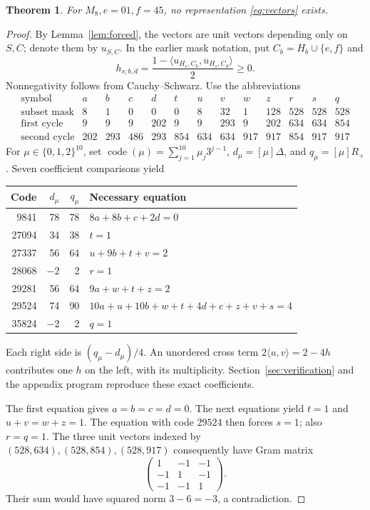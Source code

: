 \documentclass[11pt,a4paper]{article}
\newtheorem{theorem}{Theorem}
\begin{document}
\begin{theorem}\label{thm:vectors}
For $M_8,e=01,f=45$, no representation \eqref{eq:vectors} exists.
\end{theorem}
\begin{proof}
By Lemma~\ref{lem:forced}, the vectors are unit vectors depending
only on $S,C$; denote them by $u_{S,C}$. In the earlier mask notation,
put $C_b=H_b\cup\{e,f\}$ and
\[
 h_{s;b,d}=\frac{1-\langle u_{H_s,C_b},u_{H_s,C_d}\rangle}{2}\ge0.
\]
Nonnegativity follows from Cauchy--Schwarz. Use the abbreviations
\[
\begin{array}{c|rrrrrrrrrrrr}
\text{symbol}&a&b&c&d&t&u&v&w&z&r&s&q\\\hline
\text{subset mask}&8&1&0&0&0&8&32&1&128&528&528&528\\
\text{first cycle}&9&9&9&202&9&9&293&9&202&634&634&854\\
\text{second cycle}&202&293&486&293&854&634&634&917&917&854&917&917
\end{array}
\]
For $\mu\in\{0,1,2\}^{10}$, set
$\operatorname{code}(\mu)=\sum_{j=1}^{10}\mu_j3^{j-1}$,
$d_\mu=[\mu]\Delta$, and $q_\mu=[\mu]R_+$. Seven coefficient
comparisons yield
\begin{center}\small
\begin{tabular}{rrrl}
\toprule
Code & $d_\mu$ & $q_\mu$ & Necessary equation\\
\midrule
9841  & 78 & 78 & $8a+8b+c+2d=0$\\
27094 & 34 & 38 & $t=1$\\
27337 & 56 & 64 & $u+9b+t+v=2$\\
28068 & $-2$ & 2 & $r=1$\\
29281 & 56 & 64 & $9a+w+t+z=2$\\
29524 & 74 & 90 & $10a+u+10b+w+t+4d+c+z+v+s=4$\\
35824 & $-2$ & 2 & $q=1$\\
\bottomrule
\end{tabular}
\end{center}
Each right side is $(q_\mu-d_\mu)/4$. An unordered cross term
$2\langle u,v\rangle=2-4h$ contributes one $h$ on the left,
with its multiplicity. Section~\ref{sec:verification} and the
appendix program reproduce these exact coefficients.

The first equation gives $a=b=c=d=0$. The next equations yield
$t=1$ and $u+v=w+z=1$. The equation with code $29524$ then
forces $s=1$; also $r=q=1$. The three unit vectors indexed by
$(528,634),(528,854),(528,917)$ consequently have Gram matrix
\[
 \begin{pmatrix}1&-1&-1\\-1&1&-1\\-1&-1&1\end{pmatrix}.
\]
Their sum would have squared norm $3-6=-3$, a contradiction.
\end{proof}
\end{document}
